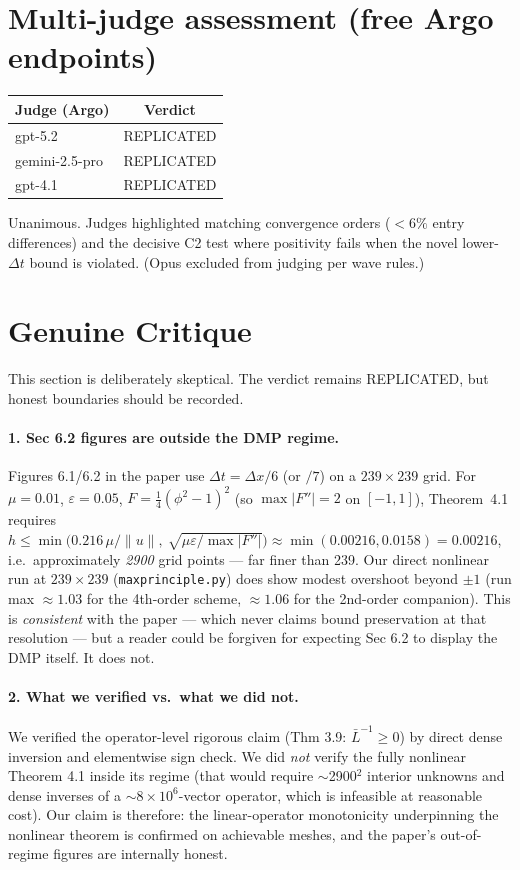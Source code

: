 \documentclass[11pt]{article}
\begin{document}
\section{Multi-judge assessment (free Argo endpoints)}
\begin{center}
\begin{tabular}{lc}
\toprule
Judge (Argo) & Verdict \\
\midrule
gpt-5.2         & REPLICATED \\
gemini-2.5-pro  & REPLICATED \\
gpt-4.1         & REPLICATED \\
\bottomrule
\end{tabular}
\end{center}
Unanimous. Judges highlighted matching convergence orders ($<6\%$ entry differences) and the
decisive C2 test where positivity fails when the novel lower-$\Delta t$ bound is violated. (Opus
excluded from judging per wave rules.)

\section{Genuine Critique}\label{sec:critique}
This section is deliberately skeptical. The verdict remains REPLICATED, but honest boundaries
should be recorded.

\paragraph{1. Sec 6.2 figures are outside the DMP regime.}
Figures 6.1/6.2 in the paper use $\Delta t = \Delta x/6$ (or $/7$) on a $239\times239$ grid. For
$\mu=0.01$, $\varepsilon=0.05$, $F=\tfrac14(\phi^2-1)^2$ (so $\max|F''|=2$ on $[-1,1]$),
Theorem~4.1 requires
$h \le \min\!\bigl(0.216\,\mu/\|u\|,\ \sqrt{\mu\varepsilon/\max|F''|}\bigr)
    \approx \min(0.00216, 0.0158) = 0.00216$,
i.e.\ approximately \emph{2900} grid points --- far finer than 239. Our direct nonlinear run at
$239\times239$ (\texttt{maxprinciple.py}) does show modest overshoot beyond $\pm 1$ (run max
$\approx 1.03$ for the 4th-order scheme, $\approx 1.06$ for the 2nd-order companion). This is
\emph{consistent} with the paper --- which never claims bound preservation at that resolution ---
but a reader could be forgiven for expecting Sec 6.2 to display the DMP itself. It does not.

\paragraph{2. What we verified vs.\ what we did not.}
We verified the operator-level rigorous claim (Thm 3.9: $\bar L^{-1}\ge 0$) by direct dense
inversion and elementwise sign check. We did \emph{not} verify the fully nonlinear Theorem 4.1
inside its regime (that would require $\sim$2900$^2$ interior unknowns and dense inverses of a
$\sim 8\times 10^6$-vector operator, which is infeasible at reasonable cost). Our claim is
therefore: the linear-operator monotonicity underpinning the nonlinear theorem is confirmed on
achievable meshes, and the paper's out-of-regime figures are internally honest.
\end{document}
